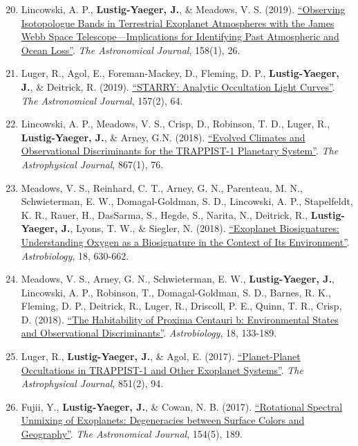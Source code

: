\documentclass[margin,10pt]{res}
\newenvironment{benumerate}[1]{
    \let\oldItem\item
    \def\item{\addtocounter{enumi}{-2}\oldItem}
    \begin{enumerate}
    \setcounter{enumi}{#1}
    \addtocounter{enumi}{1}
}{
    \end{enumerate}
}
\begin{document}
\begin{resume}
\begin{benumerate}{19}
                    \item Lincowski, A. P., \textbf{Lustig-Yaeger, J.}, \& Meadows, V. S.  (2019). \href{https://doi.org/10.3847/1538-3881/ab2385}{``Observing Isotopologue Bands in Terrestrial Exoplanet Atmospheres with the James Webb Space Telescope---Implications for Identifying Past Atmospheric and Ocean Loss''}. \textit{The Astronomical Journal}, 158(1), 26.
                    \item Luger, R., Agol, E., Foreman-Mackey, D., Fleming, D. P., \textbf{Lustig-Yaeger, J.}, \& Deitrick, R. (2019).  \href{http://adsabs.harvard.edu/cgi-bin/bib_query?arXiv:1810.06559}{``STARRY: Analytic Occultation Light Curves''}. \textit{The Astronomical Journal}, 157(2), 64.
                    \item Lincowski, A. P., Meadows, V. S., Crisp, D., Robinson, T. D., Luger, R., \textbf{Lustig-Yaeger, J.}, \& Arney, G.N. (2018). \href{http://adsabs.harvard.edu/cgi-bin/bib_query?arXiv:1809.07498}{``Evolved Climates and Observational Discriminants for the TRAPPIST-1 Planetary System''}. \textit{The Astrophysical Journal}, 867(1), 76.
                    \item Meadows, V. S.,  Reinhard, C. T., Arney, G. N., Parenteau, M. N., Schwieterman, E. W., Domagal-Goldman, S. D., Lincowski, A. P., Stapelfeldt, K. R., Rauer, H., DasSarma, S., Hegde, S., Narita, N., Deitrick, R., \textbf{Lustig-Yaeger, J.}, Lyons, T. W., \& Siegler, N. (2018).  \href{http://adsabs.harvard.edu/abs/2018AsBio..18..630M}{``Exoplanet Biosignatures:  Understanding Oxygen as a Biosignature in the Context of Its Environment''}. \textit{Astrobiology}, 18, 630-662.
                    \item Meadows, V. S., Arney, G. N., Schwieterman, E. W., \textbf{Lustig-Yaeger, J.}, Lincowski, A. P., Robinson, T.,  Domagal-Goldman, S. D., Barnes, R. K., Fleming, D. P., Deitrick, R., Luger, R., Driscoll, P. E., Quinn, T. R., Crisp, D. (2018). \href{http://adsabs.harvard.edu/abs/2018AsBio..18..133M}{``The Habitability of Proxima Centauri b: Environmental States and Observational Discriminants''}. \textit{Astrobiology}, 18, 133-189.
                    \item Luger, R., \textbf{Lustig-Yaeger, J.}, \& Agol, E. (2017).  \href{http://adsabs.harvard.edu/abs/2017ApJ...851...94L}{``Planet-Planet Occultations in TRAPPIST-1 and Other Exoplanet Systems''}. \textit{The Astrophysical Journal}, 851(2), 94.
                    \item Fujii, Y., \textbf{Lustig-Yaeger, J.}, \& Cowan, N. B. (2017). \href{http://adsabs.harvard.edu/abs/2017arXiv170804886F}{``Rotational Spectral Unmixing of Exoplanets: Degeneracies between Surface Colors and Geography''}. \textit{The Astronomical Journal}, 154(5), 189.

\end{benumerate}
\end{resume}
\end{document}

